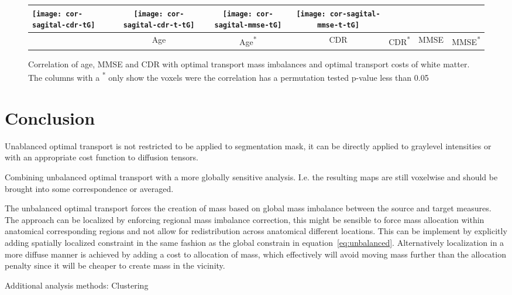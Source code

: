 \documentclass{llncs}
\begin{document}
{\begin{figure}[bth]
\begin{tabular}{l|cc|cc|cc}
\texttt{[image: cor-sagital-cdr-tG]} &
\texttt{[image: cor-sagital-cdr-t-tG]} &
\texttt{[image: cor-sagital-mmse-tG]} &
\texttt{[image: cor-sagital-mmse-t-tG]} \\ \hline \hline
& \parbox[b][4mm]{6mm}{Age} 
& \parbox[b][4mm]{6mm}{Age\textsuperscript{*}} 
& \parbox[b][4mm]{6mm}{CDR} 
& \parbox[b][4mm]{6mm}{CDR\textsuperscript{*}}
& \parbox[b][4mm]{6mm}{MMSE}
& \parbox[b][4mm]{6mm}{MMSE\textsuperscript{*}}
\end{tabular}
\caption{\label{fig:cor-oasis-white}
Correlation of age, MMSE and CDR with optimal transport mass imbalances and
optimal transport costs of white matter. The columns with a \textsuperscript{*}
only show the voxels were the correlation has a permutation tested p-value less
than 0.05  }
\end{figure}
\endgroup




\section{Conclusion}

Unablanced optimal transport is not restricted to be applied to segmentation
mask, it can be directly applied to graylevel intensities or with an
appropriate cost function to diffusion tensors. 


Combining unbalanced optimal transport with a more globally sensitive analysis.
I.e. the resulting maps are still voxelwise and should be brought into some
correspondence or averaged.

The unbalanced optimal transport forces the creation of mass based on global
mass imbalance between the source and target measures. The approach can be
localized by enforcing regional mass imbalance correction, this might be
sensible to force mass allocation within anatomical corresponding regions and not
allow for redistribution across anatomical different locations. This can be
implement by explicitly adding spatially localized constraint in the same
fashion as the global constrain in equation~\ref{eq:unbalanced}. Alternatively
localization in a more diffuse manner is achieved by adding a cost to
allocation of mass, which effectively will avoid moving mass further than the
allocation penalty since it will be cheaper to create mass in the vicinity.

Additional analysis methods: Clustering



\end{document}
